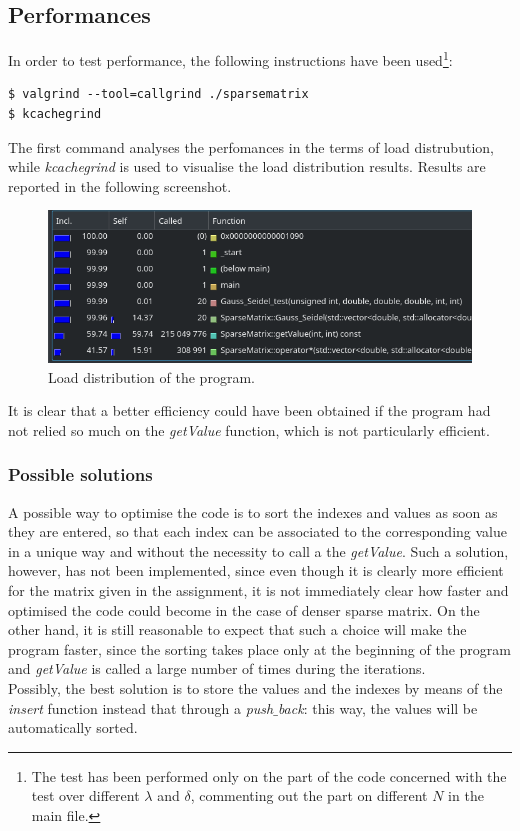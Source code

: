\documentclass[11pt]{article}
\theoremstyle{theorem}
\theoremstyle{definition}
\begin{document}
\subsection{Performances}
\label{subsec:perf}
In order to test performance, the following instructions have been used\footnote{The test has been performed only on the part of the code concerned with the test over different $\lambda$ and $\delta$, commenting out the part on different $N$ in the main file. }:
\begin{verbatim}
$ valgrind --tool=callgrind ./sparsematrix
$ kcachegrind
\end{verbatim}

The first command analyses the perfomances in the terms of load distrubution, while \emph{kcachegrind} is used to visualise the load distribution results. Results are reported in the following screenshot.

\begin{figure}[H]
	\begin{center}
		\includegraphics[width=1.0\textwidth]{kcache_perf}
	\end{center}
	\caption{Load distribution of the program.
		\label{fig:load-distr}}
\end{figure} 

It is clear that a better efficiency could have been obtained if the program had not relied so much on the \emph{getValue} function, which is not particularly efficient.\\

\subsubsection{Possible solutions}
A possible way to optimise the code is to sort the indexes and values as soon as they are entered, so that each index can be associated to the corresponding value in a unique way and without the necessity to call a the \emph{getValue}. Such a solution, however, has not been implemented, since even though it is clearly more efficient for the matrix given in the assignment, it is not immediately clear how faster and optimised the code could become in the case of denser sparse matrix. On the other hand, it is still reasonable to expect that such a choice will make the program faster, since the sorting takes place only at the beginning of the program and \emph{getValue} is called a large number of times during the iterations.\\
Possibly, the best solution is to store the values and the indexes by means of the \emph{insert} function instead that through a \emph{push$\_$back}: this way, the values
 will be automatically sorted.\\
\end{document}
